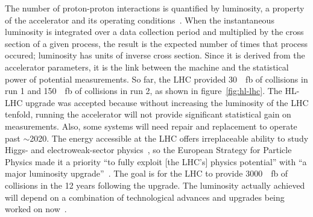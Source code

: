 The number of proton-proton interactions is quantified by luminosity, a property of the accelerator and its operating conditions~\cite{zyla_review_2020}. When the instantaneous luminosity is integrated over a data collection period and multiplied by the cross section of a given process, the result is the expected number of times that process occured; luminosity has units of inverse cross section. Since it is derived from the accelerator parameters, it is the link between the machine and the statistical power of potential measurements. 
%
%
%
%
%
%
So far, the LHC provided \SI{30}{\per\femto\barn} of collisions in run 1 and \SI{150}{\per\femto\barn} of collisions in run 2, as shown in figure~\ref{fig:hl-lhc}. The HL-LHC upgrade was accepted because without increasing the luminosity of the LHC tenfold, running the accelerator will not provide significant statistical gain on measurements. Also, some systems will need repair and replacement to operate past $\sim$2020. The energy accessible at the LHC offers irreplaceable ability to study Higgs- and electroweak-sector physics~\cite{dainese_physics_2018}, so the European Strategy for Particle Physics made it a priority ``to fully exploit [the LHC's] physics potential'' with ``a major luminosity upgrade''~\cite{european_strategy_for_particle_physics}. The goal is for the LHC to provide \SI{3000}{\per\femto\barn} of collisions in the 12 years following the upgrade. The luminosity actually achieved will depend on a combination of technological advances and upgrades being worked on now~\cite{hl_lhc_tdr}.


